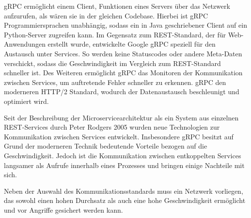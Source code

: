 gRPC ermöglicht einem Client, Funktionen eines Servers über das Netzwerk aufzurufen, als wären sie in der gleichen Codebase. Hierbei ist gRPC Programmiersprachen unabhängig, sodass ein in Java geschriebener Client auf ein Python-Server zugreifen kann. Im Gegensatz zum REST-Standard, der für Web-Anwendungen erstellt wurde, entwickelte Google gRPC speziell für den Austausch unter Services. So werden keine Statuscodes oder andere Meta-Daten verschickt, sodass die Geschwindigkeit im Vergleich zum REST-Standard schneller ist. Des Weiteren ermöglicht gRPC das Monitoren der Kommunikation zwischen Services, um auftretende Fehler schneller zu erkennen. gRPC den moderneren HTTP/2 Standard, wodurch der Datenaustausch beschleunigt und optimiert wird.

Seit der Beschreibung der Microservicearchitektur als ein System aus einzelnen REST-Services durch Peter Rodgers 2005 wurden neue Technologien zur Kommunikation zwischen Services entwickelt. Insbesondere gRPC besitzt auf Grund der moderneren Technik bedeutende Vorteile bezogen auf die Geschwindigkeit. Jedoch ist die Kommunikation zwischen entkoppelten Services langsamer als Aufrufe innerhalb eines Prozesses und bringen einige Nachteile mit sich.

Neben der Auswahl des Kommunikationsstandards muss ein Netzwerk vorliegen, das sowohl einen hohen Durchsatz als auch eine hohe Geschwindigkeit ermöglicht und vor Angriffe gesichert werden kann.
